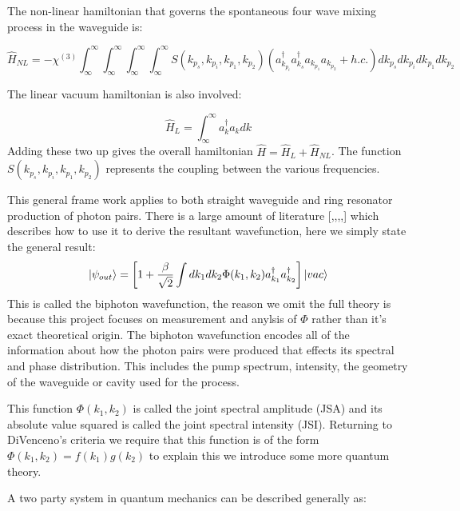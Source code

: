 The non-linear hamiltonian that governs the spontaneous four wave mixing process in the waveguide is:

\begin{equation}
\hat H_{NL} = -\chi^{(3)}\int_\infty^\infty\int_\infty^\infty\int_\infty^\infty\int_\infty^\infty S(k_{p_s},k_{p_i},k_{p_1},k_{p_2})( a_{k_{p_i}}^{\dagger}a_{k_{s}}^{\dagger}a_{k_{p_1}}a_{k_{p_2}} + h.c.)dk_{p_s}dk_{p_i}dk_{p_1}dk_{p_2}
\end{equation}

%
\noindent
The linear vacuum hamiltonian is also involved:

\begin{equation}
\hat H_{L} = \int_\infty^\infty a_{k}^{\dagger}a_{k}dk
\end{equation}
\noindent
Adding these two up gives the overall hamiltonian $\hat H = \hat H_{L} + \hat H_{NL}$. The function $S(k_{p_s},k_{p_i},k_{p_1},k_{p_2})$ represents the coupling between the various frequencies. 

This general frame work applies to both straight waveguide and ring resonator production of photon pairs. There is a large amount of literature [,,,,] which describes how to use it to derive the resultant wavefunction, here we simply state the general result:
\begin{equation}
\ket{\psi_{out}}=\left [1 + \frac{\beta}{\sqrt{2}}\int dk_1dk_2\Phi(k_1,k_2)a_{k_1}^{\dagger}a_{k_2}^{\dagger} \right ]\ket{vac} \label{JSAWavefunct}
\end{equation}
This is called the biphoton wavefunction, the reason we omit the full theory is because this project focuses on measurement and anylsis of $\Phi$ rather than it's exact theoretical origin. The biphoton wavefunction encodes all of the information about how the photon pairs were produced that effects its spectral and phase distribution. This includes the pump spectrum, intensity, the geometry of the waveguide or cavity used for the process.

This function $\Phi(k_1,k_2)$ is called the joint spectral amplitude (JSA) and its absolute value squared is called the joint spectral intensity (JSI). Returning to DiVenceno's criteria we require that this function is of the form $\Phi(k_1,k_2)=f(k_1)g(k_2)$ to explain this we introduce some more quantum theory.

A two party system in quantum mechanics can be described generally as:

